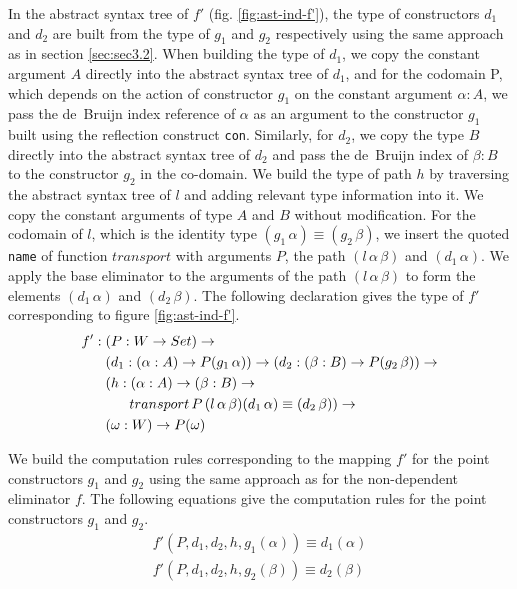 \documentclass[sigplan,10pt]{acmart}
\begin{document}
In the abstract syntax tree of $f'$ (fig. \ref{fig:ast-ind-f'}), the type of constructors $d_1$ and $d_2$ are built from the type of $g_1$ and $g_2$ respectively using the same approach as in section \eqref{sec:sec3.2}. When building the type of $d_1$, we copy the constant argument $A$ directly into the abstract syntax tree of $d_1$, and for the codomain P, which depends on the action of constructor $g_1$ on the constant argument $\alpha : A$, we pass the de~Bruijn index reference of $\alpha$ as an argument to the constructor $g_1$ built using the reflection construct {\tt con}. Similarly, for $d_2$, we copy the type $B$ directly into the abstract syntax tree of $d_2$ and pass the de~Bruijn index of $\beta : B$ to the constructor $g_2$ in the co-domain. We build the type of path $h$ by traversing the abstract syntax tree of $l$ and adding relevant type information into it. We copy the constant arguments of type $A$ and $B$ without modification. For the codomain of $l$, which is the identity type $(g_1 \, \alpha) \equiv (g_2 \, \beta)$, we insert the quoted {\tt name} of function $transport$ with arguments $P$, the path $(l \, \alpha \, \beta)$ and $(d_1 \, \alpha)$. We apply the base eliminator to the arguments of the path $(l \, \alpha \, \beta)$ to form the elements $(d_1 \, \alpha)$ and $(d_2 \, \beta)$. The following declaration gives the type of $f'$ corresponding to figure \eqref{fig:ast-ind-f'}.
\begin{align}
& f' : (P : W \rightarrow Set) \rightarrow \nonumber \\
& \hspace {0.6cm} (d_1 : (\alpha : A) \rightarrow P (g_1 \, \alpha)) \rightarrow (d_2 : (\beta : B) \rightarrow P (g_2 \, \beta)) \rightarrow \nonumber \\
& \hspace {0.6cm} (h : (\alpha : A) \rightarrow (\beta : B) \rightarrow \nonumber \\
& \hspace {1.2cm} transport \, P \, (l \, \alpha \, \beta) (d_1 \, \alpha) \equiv (d_2 \, \beta)) \rightarrow \nonumber \\
& \hspace {0.6cm} (\omega : W) \rightarrow P (\omega) \nonumber
\end{align}

We build the computation rules corresponding to the mapping $f'$ for the point constructors $g_1$ and $g_2$ using the same approach as for the non-dependent eliminator $f$. The following equations give the computation rules for the point constructors $g_1$ and $g_2$.
\begin{align}
f' (P, d_1, d_2, h, g_1 (\alpha)) \equiv d_1 (\alpha) \nonumber \\
f' (P, d_1, d_2, h, g_2 (\beta)) \equiv d_2 (\beta) \nonumber
\end{align}
\end{document}
